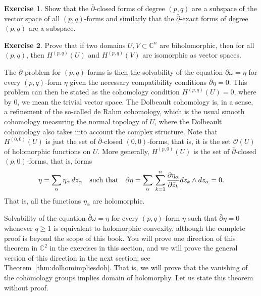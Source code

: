 \documentclass[12pt,openany]{book}
\newcommand{\avoidbreak}{\postdisplaypenalty=100}
\newcommand{\C}{{\mathbb{C}}}
\newcommand{\sO}{{\mathscr{O}}}
\theoremstyle{plain}
\theoremstyle{remark}
\theoremstyle{definition}
\newenvironment{exbox}{%
    \def\FrameCommand{\vrule width 1pt \relax\hspace{10pt}}%
    \MakeFramed{\advance\hsize-\width\FrameRestore}%
}{%
    \endMakeFramed
}
\theoremstyle{exercise}
\newtheorem{exercise}{Exercise}[section]
\theoremstyle{example}
\newcommand{\thmref}[1]{\hyperref[#1]{Theorem~\ref*{#1}}}
\begin{document}
\begin{exbox}
\begin{exercise}
Show that the $\bar{\partial}$-closed forms of degree $(p,q)$
are a subspace of the vector space of all $(p,q)$-forms and similarly
that the
$\bar{\partial}$-exact forms of degree $(p,q)$
are a subspace.
\end{exercise}

\begin{exercise}
Prove that if two domains $U,V \subset \C^n$ are biholomorphic,
then for all $(p,q)$, then $H^{(p,q)}(U)$ and $H^{(p,q)}(V)$
are isomorphic as vector spaces.
\end{exercise}
\end{exbox}

The $\bar{\partial}$-problem for $(p,q)$-forms is then the solvability
of the equation $\bar{\partial} \omega = \eta$ for every $(p,q)$-form
$\eta$ given the necessary
compatibility conditions $\bar{\partial} \eta = 0$.
This problem
can then be stated as the cohomology condition $H^{(p,q)}(U) = 0$,
where by $0$, we mean the trivial vector space.
The Dolbeault cohomology is, in a sense, a refinement
of the so-called de Rahm cohomology,
which is the usual smooth cohomology measuring the normal topology of $U$,
where the Dolbeault cohomology also takes into account the complex structure.
Note that $H^{(0,0)}(U)$ is just the set of $\bar{\partial}$-closed
$(0,0)$-forms, that is, it is the set $\sO(U)$ of holomorphic functions on $U$.
More generally, $H^{(p,0)}(U)$ is the set of $\bar{\partial}$-closed
$(p,0)$-forms, that is, forms
\begin{equation*}
\eta =
\sum_{\alpha}
\eta_{\alpha} \, dz_\alpha
\quad \text{such that}
\quad
\bar{\partial} \eta
=
\sum_{\alpha}
\,
\sum_{k=1}^n
\frac{\partial \eta_{\alpha}}{\partial \bar{z}_k} d\bar{z}_k \wedge
dz_\alpha = 0.
\avoidbreak
\end{equation*}
That is, all the functions $\eta_{\alpha}$ are holomorphic.

Solvability of the equation $\bar{\partial} \omega = \eta$ for every $(p,q)$-form
$\eta$ such that $\bar{\partial} \eta = 0$ whenever $q \geq 1$
is equivalent to holomorphic convexity, although
the complete proof is beyond the scope of this book.  You will prove
one direction of this theorem in $\C^2$ in the exercises in this section,
and we will prove the general version of this direction in the next section;
see \thmref{thm:dolhomimpliesdoh}.  That is, we will prove that
the vanishing of the cohomology groups implies domain of holomorphy.
Let us state this theorem without proof.
\end{document}
